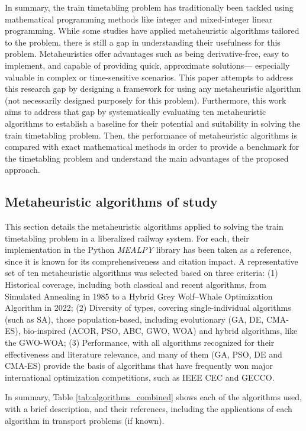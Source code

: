 \documentclass[Afour,sagev,times]{sagej}
\begin{document}
In summary, the train timetabling problem has traditionally been tackled using mathematical programming methods like integer and mixed-integer linear programming. While some studies have applied metaheuristic algorithms tailored to the problem, there is still a gap in understanding their usefulness for this problem. Metaheuristics offer advantages such as being derivative-free, easy to implement, and capable of providing quick, approximate solutions— especially valuable in complex or time-sensitive scenarios. 
This paper attempts to address this research gap by designing a framework for using any metaheuristic algorithm (not necessarily designed purposely for this problem). Furthermore, this work aims to address that gap by systematically evaluating ten metaheuristic algorithms to establish a baseline for their potential and suitability in solving the train timetabling problem. Then, the performance of metaheuristic algorithms is compared with exact mathematical methods in order to provide a benchmark for the timetabling problem and understand the main advantages of the proposed approach.

\subsection{Metaheuristic algorithms of study}

This section details the metaheuristic algorithms applied to solving the train timetabling problem in a liberalized railway system. For each, their implementation in the Python \textit{MEALPY} library has been taken as a reference, since it is known for its comprehensiveness and citation impact. A representative set of ten metaheuristic algorithms was selected based on three criteria: (1) Historical coverage, including both classical and recent algorithms, from Simulated Annealing in 1985 to a Hybrid Grey Wolf–Whale Optimization Algorithm in 2022; (2) Diversity of types, covering single-individual algorithms (such as SA), those population-based, including evolutionary (GA, DE, CMA-ES), bio-inspired (ACOR, PSO, ABC, GWO, WOA) and hybrid algorithms, like the GWO-WOA; (3) Performance, with all algorithms recognized for their effectiveness and literature relevance, and many of them (GA, PSO, DE and CMA-ES) provide the basis of algorithms that have frequently won major international optimization competitions, such as IEEE CEC \cite{Qiao24} and GECCO\cite{GECCO}.


In summary, Table \ref{tab:algorithms_combined} shows each of the algorithms used, with a brief description, and their references, including the applications of each algorithm in transport problems (if known).
\end{document}
